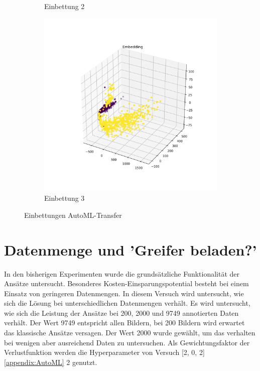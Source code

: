 \begin{figure}[h]
\begin{subfigure}[c]{0.32\textwidth}
			\caption{Einbettung 2}
			\label{img:AutoMLEinbettungV2}	
		\end{subfigure}
		\begin{subfigure}[c]{0.32\textwidth}			
			\includegraphics[width=1\textwidth, center]{src/AutoML/3/Embedding.png}
			\caption{Einbettung 3}
			\label{img:AutoMLEinbettungV3}	
		\end{subfigure}
		\caption{Einbettungen AutoML-Transfer}
		\label{img:EmbeddingAutoMLTransfer}
	\end{figure}
	
	\section{Datenmenge und 'Greifer beladen?'}
	\label{sec:TransferDatenmenge}
	In den bisherigen Experimenten wurde die grundsätzliche Funktionalität der Ansätze untersucht. Besonderes  Kosten-Einsparungspotential besteht bei einem Einsatz von geringeren Datenmengen. In diesem Versuch wird untersucht, wie sich die Lösung bei unterschiedlichen Datenmengen verhält. Es wird untersucht, wie sich die Leistung der Ansätze bei 200, 2000 und 9749 annotierten Daten verhält. Der Wert 9749 entspricht allen Bildern, bei 200 Bildern wird erwartet das klassische Ansätze versagen. Der Wert 2000 wurde gewählt, um das verhalten bei wenigen aber ausreichend Daten zu untersuchen. Als Gewichtungsfaktor der Verlustfunktion werden die Hyperparameter von Versuch [2, 0, 2] \ref{appendix:AutoML} 2 genutzt. 
	
